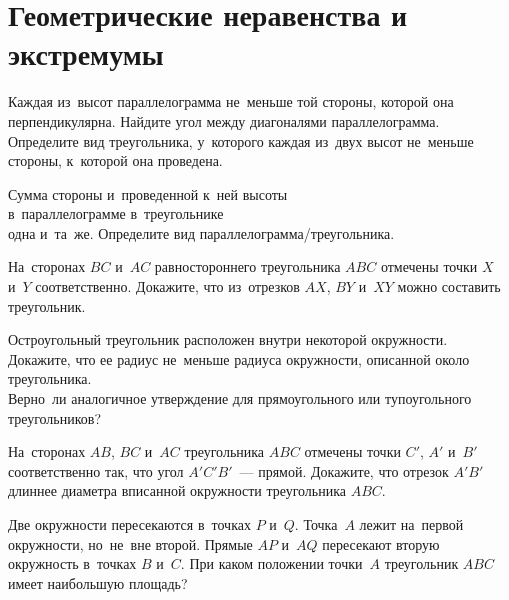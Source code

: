 
\section*{Геометрические неравенства и экстремумы}


\begin{problems}

\item
\subproblem
Каждая из~высот параллелограмма не~меньше той стороны, которой она
перпендикулярна.
Найдите угол между диагоналями параллелограмма.
\\
\subproblem
Определите вид треугольника, у~которого каждая из~двух высот не~меньше стороны,
к~которой она проведена.

\item
Сумма стороны и~проведенной к~ней высоты
\\
\subproblem в~параллелограмме
\quad
\subproblem в~треугольнике
\\
одна и~та~же.
Определите вид параллелограмма/треугольника.

\item
На~сторонах $BC$ и~$AC$ равностороннего треугольника $ABC$ отмечены
точки $X$ и~$Y$ соответственно.
Докажите, что из~отрезков $AX$, $BY$ и~$XY$ можно составить треугольник.

\item
\subproblem
Остроугольный треугольник расположен внутри некоторой окружности.
Докажите, что ее радиус не~меньше радиуса окружности, описанной около
треугольника.
\\
\subproblem
Верно~ли аналогичное утверждение для прямоугольного или тупоугольного
треугольников?

\item
На~сторонах $AB$, $BC$ и~$AC$ треугольника $ABC$ отмечены
точки $C'$, $A'$ и~$B'$ соответственно так, что угол $A'C'B'$~--- прямой.
Докажите, что отрезок $A'B'$ длиннее диаметра вписанной окружности
треугольника $ABC$.

\item
Две окружности пересекаются в~точках $P$ и~$Q$.
Точка~$A$ лежит на~первой окружности, но~не~вне второй.
Прямые $AP$ и~$AQ$ пересекают вторую окружность в~точках $B$ и~$C$.
При каком положении точки~$A$ треугольник $ABC$ имеет наибольшую площадь?


\end{problems}
